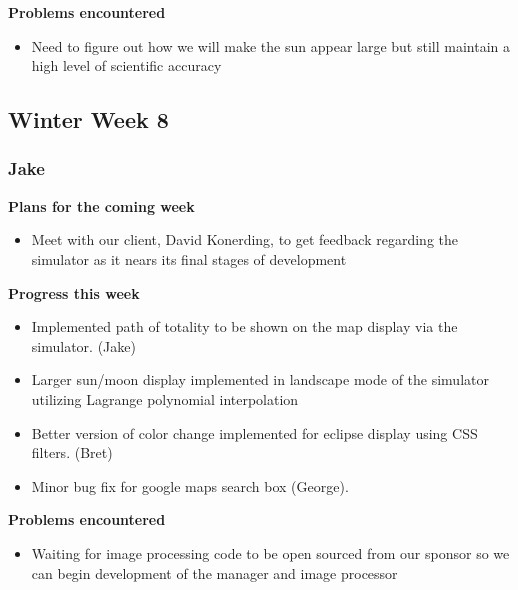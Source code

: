 \documentclass[10pt, onecolumn, draftclsnofoot, letterpaper, compsoc]{IEEEtran}
\begin{document}
    \noindent \textbf{Problems encountered}

    \begin{itemize}

    \item Need to figure out how we will make the sun appear large but still maintain a high level of scientific accuracy

    \end{itemize}

\subsection{Winter Week 8}

    \subsubsection{Jake}

    \noindent \textbf{Plans for the coming week}

    \begin{itemize}

    \item Meet with our client, David Konerding, to get feedback regarding the simulator as it nears its final stages of development

    \end{itemize}

    \noindent \textbf{Progress this week}

    \begin{itemize}

    \item Implemented path of totality to be shown on the map display via the simulator. (Jake)
    \item Larger sun/moon display implemented in landscape mode of the simulator utilizing Lagrange polynomial interpolation
    \item Better version of color change implemented for eclipse display using CSS filters. (Bret)
    \item Minor bug fix for google maps search box (George).

    \end{itemize}

    \noindent \textbf{Problems encountered}

    \begin{itemize}

    \item Waiting for image processing code to be open sourced from our sponsor so we can begin development of the manager and image processor

    \end{itemize}
\end{document}
